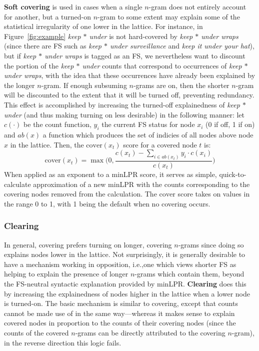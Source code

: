 \documentclass[11pt,letterpaper]{article}
\makeatletter
\def \ie {i.e.,\@ }
\newcommand{\gap}{$*$\xspace}
\newcommand{\ex}[1]{\textit{#1}\xspace}
\newcommand{\termdef}[1]{\textbf{#1}\xspace}
\newcommand{\cover}{\ensuremath{\text{cover}}\xspace}
\newcommand{\figref}[2][]{Figure#1~\ref{#2}\xspace}
\makeatother
\begin{document}
\termdef{Soft covering} is used in cases when a single $n$-gram does not entirely account for another, but a turned-on $n$-gram to some extent may explain some of the statistical irregularity of one lower in the lattice. For instance, in \figref{fig:example} \ex{keep \gap under} is not hard-covered by \ex{keep \gap under wraps} (since there are FS such as \ex{keep \gap under surveillance} and \ex{keep it under your hat}), but if \ex{keep \gap under wraps} is tagged as an FS, we nevertheless want to discount the portion of the \ex{keep \gap under} counts that correspond to occurrences of \ex{keep \gap under wraps}, with the idea that these occurrences have already been explained by the longer $n$-gram. If enough subsuming $n$-grams are on, then the shorter $n$-gram will be discounted to the extent that it will be turned off, preventing redundancy. This effect is accomplished by increasing the turned-off explainedness of \ex{keep \gap under} (and thus making turning on less desirable) in the following manner: let $c(\cdot)$ be the count function, $y_i$ the current FS status for node $x_i$ (0 if off, 1 if on) and $ab(x)$ a function which produces the set of indicies of all nodes above node $x$ in the lattice. Then, the $\cover(x_t)$ score for a covered node $t$ is:
\begin{displaymath}
\cover(x_t) = \max\Big(0,\frac{c(x_t) - \sum_{i \in ab(x_t)}y_i\cdot{c(x_i)}}{c(x_t)}\Big)
\end{displaymath}
When applied as an exponent to a minLPR score, it serves as simple, quick-to-calculate approximation of a new minLPR with the counts corresponding to the covering nodes removed from the calculation. The \cover score takes on values in the range 0 to 1, with 1 being the default when no covering occurs.

\subsubsection{Clearing}

In general, covering prefers turning on longer, covering $n$-grams since doing so explains nodes lower in the lattice. Not surprisingly, it is generally desirable to have a mechanism working in opposition, \ie one which views shorter FS as helping to explain the presence of longer $n$-grams which contain them, beyond the FS-neutral syntactic explanation provided by minLPR. \termdef{Clearing} does this by increasing the explainedness of nodes higher in the lattice when a lower node is turned-on. The basic mechanism is similar to covering, except that counts cannot be made use of in the same way---whereas it makes sense to explain covered nodes in proportion to the counts of their covering nodes (since the counts of the covered $n$-grams can be directly attributed to the covering $n$-gram), in the reverse direction this logic fails. 
\end{document}

